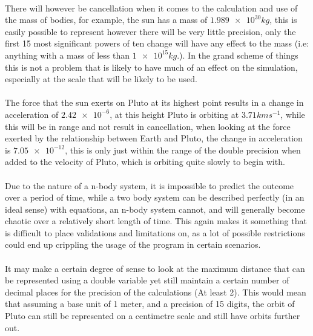 \paragraph{}
There will however be cancellation when it comes to the calculation and use of the mass of bodies, for example, the sun has a mass of $\num{1.989e30} kg$, this is easily possible to represent however there will be very little precision, only the first 15 most significant powers of ten change will have any effect to the mass (i.e: anything with a mass of less than $\num{1e15} kg$.). In the grand scheme of things this is not a problem that is likely to have much of an effect on the simulation, especially at the scale that will be likely to be used.

\paragraph{}
The force that the sun exerts on Pluto at its highest point results in a change in acceleration of $\num{2.42e-6}$, at this height Pluto is orbiting at $3.71 kms^{-1}$, while this will be in range and not result in cancellation, when looking at the force exerted by the relationship between Earth and Pluto, the change in acceleration is $\num{7.05e-12}$, this is only just within the range of the double precision when added to the velocity of Pluto, which is orbiting quite slowly to begin with.

\paragraph{}
Due to the nature of a n-body system, it is impossible to predict the outcome over a period of time, while a two body system can be described perfectly (in an ideal sense) with equations, an n-body system cannot, and will generally become chaotic over a relatively short length of time. This again makes it something that is difficult to place validations and limitations on, as a lot of possible restrictions could end up crippling the usage of the program in certain scenarios.

\paragraph{}
It may make a certain degree of sense to look at the maximum distance that can be represented using a double variable yet still maintain a certain number of decimal places for the precision of the calculations (At least 2). This would mean that assuming a base unit of 1 meter, and a precision of 15 digits, the orbit of Pluto can still be represented on a centimetre scale and still have orbits further out.

